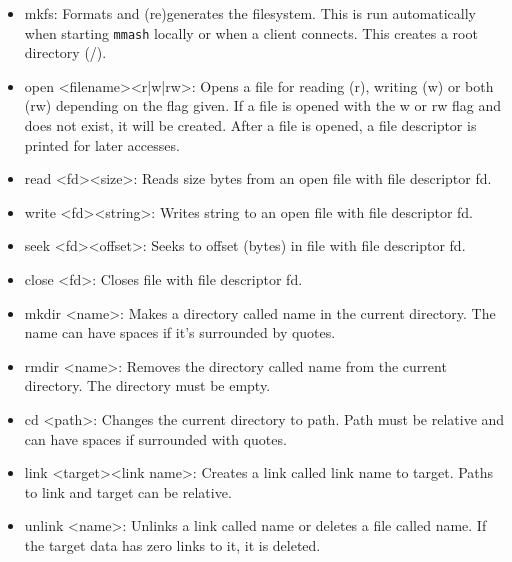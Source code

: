 \documentclass[]{article}
\begin{document}
\begin{itemize}
	\item mkfs: Formats and (re)generates the filesystem. This is run automatically when starting \texttt{mmash} locally or when a client connects. This creates a root directory (/).
	
	\item open \textless filename\textgreater \space \textless r|w|rw\textgreater: Opens a file for reading (r), writing (w) or both (rw) depending on the flag given. If a file is opened with the w or rw flag and does not exist, it will be created. After a file is opened, a file descriptor is printed for later accesses. 
	
	\item read \textless fd\textgreater \space \textless size\textgreater: Reads size bytes from an open file with file descriptor fd. 
	
	\item write \textless fd\textgreater \space \textless string\textgreater: Writes string to an open file with file descriptor fd. 
	
	\item seek \textless fd\textgreater \space \textless offset\textgreater: Seeks to offset (bytes) in file with file descriptor fd. 
	
	\item close \textless fd\textgreater: Closes file with file descriptor fd. 
	
	\item mkdir \textless name\textgreater: Makes a directory called name in the current directory. The name can have spaces if it's surrounded by quotes.
	
	\item rmdir \textless name\textgreater: Removes the directory called name from the current directory. The directory must be empty.
	
	\item cd \textless path\textgreater: Changes the current directory to path. Path must be relative and can have spaces if surrounded with quotes. 
	
	\item link \textless target\textgreater \space \textless link name\textgreater: Creates a link called link name to target. Paths to link and target can be relative.
	
	\item unlink \textless name\textgreater: Unlinks a link called name or deletes a file called name. If the target data has zero links to it, it is deleted. 
	

\end{itemize}
\end{document}
